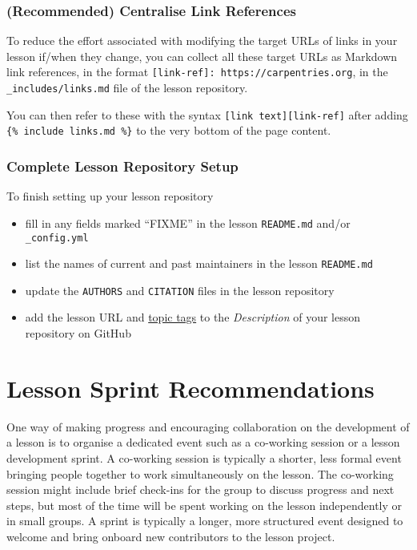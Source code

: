 \documentclass[
]{book}
\providecommand{\tightlist}{%
  \setlength{\itemsep}{0pt}\setlength{\parskip}{0pt}}
\begin{document}
\hypertarget{recommended-centralise-link-references}{%
\subsection{(Recommended) Centralise Link References}\label{recommended-centralise-link-references}}

To reduce the effort associated with modifying the target URLs of
links in your lesson if/when they change,
you can collect all these target URLs as Markdown link references,
in the format \texttt{{[}link-ref{]}:\ https://carpentries.org},
in the \texttt{\_includes/links.md} file of the lesson repository.

You can then refer to these with the syntax \texttt{{[}link\ text{]}{[}link-ref{]}}
after adding \texttt{\{\%\ include\ links.md\ \%\}} to the very bottom of the page content.

\hypertarget{complete-lesson-repository-setup}{%
\subsection{Complete Lesson Repository Setup}\label{complete-lesson-repository-setup}}

To finish setting up your lesson repository

\begin{itemize}
\tightlist
\item
  fill in any fields marked ``FIXME'' in the lesson \texttt{README.md} and/or \texttt{\_config.yml}
\item
  list the names of current and past maintainers in the lesson \texttt{README.md}
\item
  update the \texttt{AUTHORS} and \texttt{CITATION} files in the lesson repository
\item
  add the lesson URL and
  \href{https://cdh.carpentries.org/the-carpentries-incubator.html\#topic-tags}{topic tags}
  to the \emph{Description} of your lesson repository on GitHub
\end{itemize}

\hypertarget{lesson-sprint-recommendations}{%
\chapter{Lesson Sprint Recommendations}\label{lesson-sprint-recommendations}}

One way of making progress and encouraging collaboration on the development
of a lesson is to organise a dedicated event such as a co-working session
or a lesson development sprint.
A co-working session is typically a shorter, less formal event bringing
people together to work simultaneously on the lesson.
The co-working session might include brief check-ins for the group to discuss
progress and next steps, but most of the time will be spent working on the lesson
independently or in small groups.
A sprint is typically a longer, more structured event designed to welcome and
bring onboard new contributors to the lesson project.
\end{document}
